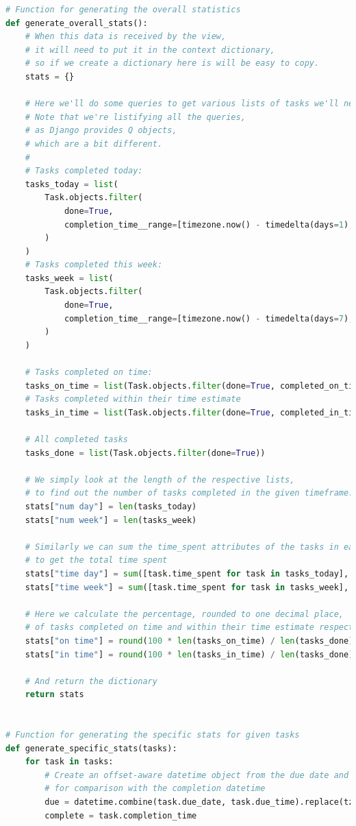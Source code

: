 \documentclass{article}
\begin{document}
\begin{lstlisting}[language=Python]
# Function for generating the overall statistics
def generate_overall_stats():
    # When this data is received by the view,
    # it will need to put it in the context dictionary,
    # so if we create a dictionary here is will be easy to copy.
    stats = {}

    # Here we'll do some queries to get various lists of tasks we'll need.
    # Note that we're listifying all the queries,
    # as Django provides Q objects,
    # which are a bit different.
    #
    # Tasks completed today:
    tasks_today = list(
        Task.objects.filter(
            done=True,
            completion_time__range=[timezone.now() - timedelta(days=1), timezone.now()],
        )
    )
    # Tasks completed this week:
    tasks_week = list(
        Task.objects.filter(
            done=True,
            completion_time__range=[timezone.now() - timedelta(days=7), timezone.now()],
        )
    )

    # Tasks completed on time:
    tasks_on_time = list(Task.objects.filter(done=True, completed_on_time=True))
    # Tasks completed within their time estimate
    tasks_in_time = list(Task.objects.filter(done=True, completed_in_time=True))

    # All completed tasks
    tasks_done = list(Task.objects.filter(done=True))

    # We simply look at the length of the respective lists,
    # to find out the number of tasks completed in the given timeframe.
    stats["num day"] = len(tasks_today)
    stats["num week"] = len(tasks_week)

    # Similarly we can sum the time_spent attributes of the tasks in each list,
    # to get the total time spent
    stats["time day"] = sum([task.time_spent for task in tasks_today], timedelta())
    stats["time week"] = sum([task.time_spent for task in tasks_week], timedelta())

    # Here we calculate the percentage, rounded to one decimal place,
    # of tasks completed on time and within their time estimate respectively
    stats["on time"] = round(100 * len(tasks_on_time) / len(tasks_done), 1)
    stats["in time"] = round(100 * len(tasks_in_time) / len(tasks_done), 1)

    # And return the dictionary
    return stats


# Function for generating the specific stats for given tasks
def generate_specific_stats(tasks):
    for task in tasks:
        # Create an offset-aware datetime object from the due date and due time,
        # for comparison with the completion datetime
        due = datetime.combine(task.due_date, task.due_time).replace(tzinfo=pytz.UTC)
        complete = task.completion_time


\end{lstlisting}
\end{document}
